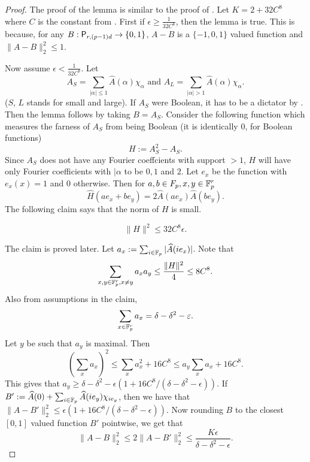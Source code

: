 \begin{proof}
The proof of the lemma is similar to the proof of \cite[Lemma 2.4]{AlonDFS2004}.
Let $K = 2 + 32C^8$ where $C$ is the constant
from .
First if $\epsilon \geq \frac{1}{32C^8}$, then the lemma is true. 
This is because, for any $B:\mathsf P_{r,(p-1)d}\rightarrow\{0,1\}$, 
$A-B$ is a $\{-1, 0,1\}$ valued function and $\| A-B\|^2_2 \leq 1$.

Now assume $\epsilon < \frac{1}{32C^8}$. Let
$$A_S = \sum_{|\alpha| \leq 1} \widehat A(\alpha) \chi_\alpha \mbox{ and } A_L = \sum_{|\alpha| > 1} \widehat A(\alpha) \chi_\alpha.$$
($S$, $L$ stands for small and large). If $A_S$ were Boolean, it  has to be a dictator by . Then the lemma follows by taking $B=A_S$. Consider the following function
which measures the farness of $A_S$ from being Boolean (it is identically $0$, for Boolean functions)
$$H := A_S^2 - A_S.$$
Since $A_S$ does not have any Fourier coeffcients with support $>1$, $H$ will have only Fourier coefficients  with $|\alpha$ to be $0,1$ and $2$.
Let $e_x$ be the function with $e_x(x)=1$ and $0$ otherwise. Then for $a,b \in F_p, x,y \in \mathbb F_p^r$
$$ \widehat H(ae_x + be_y) = 2 \widehat A(ae_x) \widehat A(be_y).$$
The following claim says that the norm of $H$ is small.
\begin{claim}\label{claim:h}
$$\|H\|^2 \leq 32C^8 \epsilon.$$
\end{claim}
The claim is proved later. Let $a_x := \sum_{ i \in \mathbb F_p} | \widehat A(i e_x)|$. Note that
\begin{equation}
\sum_{x,y \in \mathbb F_p^r, x\neq y} a_x a_y \leq \frac{\|H\|^2}{4} \leq 8 C^8 .
\end{equation}
Also from assumptions in the claim, 
\begin{equation}
\sum_{x \in \mathbb F_p^r} a_x = \delta - \delta^2 - \varepsilon.
\end{equation}
Let $y$ be such that $a_y$ is maximal. Then
$$(\sum_x a_x)^2 \leq \sum_x a_x^2 + 16C^8 \leq a_y \sum_x a_x + 16C^8.$$
This gives that $a_y \geq \delta -\delta^2 -\epsilon(1+ 16C^8/(\delta -\delta^2 - \epsilon))$.
If $B' := \widehat A(0) + \sum_{i \in \mathbb F_p} \widehat A(i e_y) \chi_{i e_y}$, then 
we have that $\|A - B'\|^2_2 \leq \epsilon(1+ 16C^8/(\delta -\delta^2 - \epsilon)).$
Now rounding $B$ to the closest $[0,1]$ valued function $B'$ pointwise, we get that
$$\|A-B\|_2^2 \leq 2\|A-B'\|_2^2 \leq  \frac{K\epsilon}{\delta -\delta^2-\epsilon}.$$



\end{proof}
